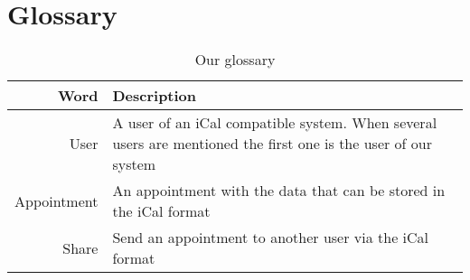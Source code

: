 \section{Glossary}
\begin{table*}[ht]\centering
  \begin{tabularx}{\textwidth}{@{}rX@{}}
    \toprule
    \textbf{Word} & \textbf{Description} \\\hline
    User        & A user of an iCal compatible system. When several users are mentioned the first one is the user of our system \\\hline
    Appointment & An appointment with the data that can be stored in the iCal format \\\hline
    Share       & Send an appointment to another user via the iCal format \\
    \bottomrule
  \end{tabularx}
  \caption{Our glossary}
  \label{glossary}\centering
\end{table*}
